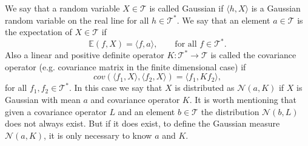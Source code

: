 \documentclass[12pt]{book}
\newcommand{\E}{\mathbb{E}} %
\newcommand{\tvs}{\mathscr{T}} %
\begin{document}
We say that a random variable $X\in\tvs$ is called Gaussian if $\langle h,X\rangle$ is
a Gaussian random variable on the real line for all $h\in\tvs^{*}$. We say that an element $a\in\tvs$ is the 
expectation of $X\in\tvs$ if 
\begin{equation*}
\E(f,X)=\langle f, a\rangle,\qquad\text{for all }f\in\tvs^{*}.
\end{equation*}
Also a linear and positive definite operator $K:\tvs^{*}\longrightarrow \tvs$ 
is called the covariance operator (e.g. covariance
matrix in the finite dimensional case) if
\begin{equation*}
cov(\langle f_{1},X\rangle,\langle f_{2},X\rangle)=\langle f_{1},Kf_{2}\rangle,
\end{equation*}
for all $f_{1},f_{2}\in\tvs^{*}$. In this case we say that $X$ is distributed as 
$\mathcal{N}(a,K)$ if  $X$ is Gaussian with mean $a$ and covariance operator $K$. It is worth mentioning
that given a covariance operator $L$ and an element $b\in\tvs$ the distribution $\mathcal{N}(b,L)$
does not always exist. But if it does exist, to define the  Gaussian measure $\mathcal{N}(a,K)$, it is
only necessary to know $a$ and $K$.
\newline


\end{document}
